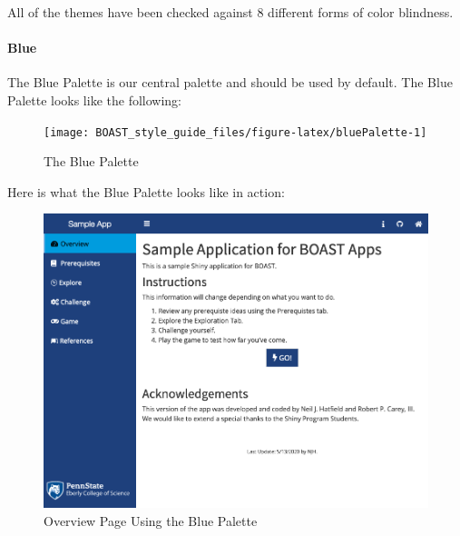 \documentclass[
]{book}
\begin{document}
All of the themes have been checked against 8 different forms of color blindness.

\hypertarget{blue}{%
\paragraph{Blue}\label{blue}}

The Blue Palette is our central palette and should be used by default. The Blue Palette looks like the following:

\begin{figure}

{\centering \texttt{[image: BOAST\_style\_guide\_files/figure-latex/bluePalette-1]} 

}

\caption{The Blue Palette}\label{fig:bluePalette}
\end{figure}

Here is what the Blue Palette looks like in action:

\begin{figure}

{\centering \includegraphics[width=13.26in]{images/colorThemes/blueOverview} 

}

\caption{Overview Page Using the Blue Palette}\label{fig:blueAction1}
\end{figure}
\end{document}
